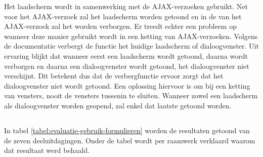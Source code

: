 Het laadscherm wordt in samenwerking met de AJAX-verzoeken gebruikt.
Net voor het AJAX-verzoek zal het laadscherm worden getoond en in de  van het AJAX-verzoek zal het worden verborgen.
Er treedt echter een probleem op wanneer deze manier gebruikt wordt in een ketting van AJAX-verzoeken.
Volgens de documentatie verbergt de functie het huidige laadscherm of dialoogvenster. 
Uit ervaring blijkt dat wanneer eerst een laadscherm wordt getoond, daarna wordt verborgen en daarna een dialoogvenster wordt getoond, het dialoogvenster niet verschijnt.
Dit betekent dus dat de verbergfunctie ervoor zorgt dat het dialoogvenster niet wordt getoond.
Een oplossing hiervoor is om bij een ketting van vensters, nooit de vensters tussenin te sluiten.
Wanneer zowel een laadscherm als dialoogvenster worden geopend, zal enkel dat laatste getoond worden.


\subsection{}
\label{sec:evaluatie-gebruik-formulieren}

In tabel \ref{tabel:evaluatie-gebruik-formulieren} worden de resultaten getoond van de zeven deeluitdagingen.
Onder de tabel wordt per raamwerk verklaard waarom dat resultaat werd behaald.

\begin{table}
\centering
{}
\caption{Gebruik van .}
\label{tabel:evaluatie-gebruik-formulieren}
\end{table}

